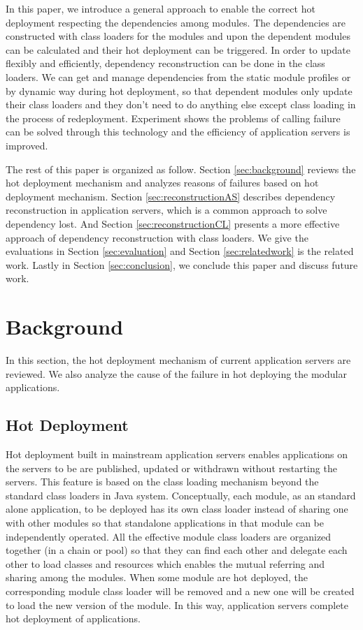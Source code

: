 \documentclass[conference]{IEEEtran}
\begin{document}
In this paper, we introduce a general approach to enable the correct hot deployment respecting the dependencies among modules. The dependencies are constructed with class loaders for the modules and upon the dependent modules can be calculated and their hot deployment can be triggered. In order to update flexibly and efficiently, dependency reconstruction can be done in the class loaders. We can get and manage dependencies from the static module profiles or by dynamic way during hot deployment, so that dependent modules only update their class loaders and they don't need to do anything else except class loading in the process of redeployment. Experiment shows the problems of calling failure can be solved through this technology and the efficiency of application servers is improved.

The rest of this paper is organized as follow. 
Section \ref{sec:background} reviews the hot deployment mechanism and analyzes reasons of failures based on hot deployment mechanism. 
Section \ref{sec:reconstructionAS} describes dependency reconstruction in application servers, which is a common approach to solve dependency lost.
And Section \ref{sec:reconstructionCL} presents a more effective approach of dependency reconstruction with class loaders.
We give the evaluations in Section \ref{sec:evaluation} and Section \ref{sec:relatedwork} is the related work.
Lastly in Section \ref{sec:conclusion}, we conclude this paper and discuss future work.



\section{Background\label{sec:background}}
In this section, the hot deployment mechanism of current application servers are reviewed. We also analyze the cause of the failure in hot deploying the modular applications.

\subsection{Hot Deployment}

Hot deployment built in mainstream application servers enables applications on the servers to be are published, updated or withdrawn without restarting the servers. This feature is based on the class loading mechanism beyond the standard class loaders\cite{standard_cl} in Java system. Conceptually, each module, as an standard alone application, to be deployed has its own class loader instead of sharing one with other modules so that standalone applications in that module can be independently operated. All the effective module class loaders are organized together (in a chain or pool) so that they can find each other and delegate each other to load classes and resources which enables the mutual referring and sharing among the modules. When some module are hot deployed, the corresponding module class loader will be removed and a new one will be created to load the new version of the module. In this way, application servers complete hot deployment of applications\cite{module_cl}.
\end{document}
